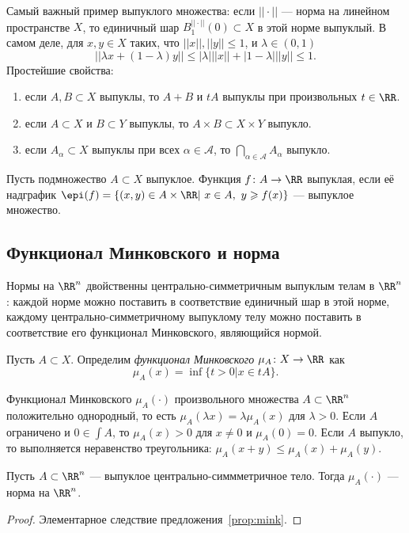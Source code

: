 Самый важный пример выпуклого множества: если $||\cdot||$ --- норма на линейном пространстве $X$, то единичный шар $B^{||\cdot||}_1(0)\subset X$ в этой норме выпуклый. В самом деле, для $x,y\in X$ таких, что $||x||,||y||\leqslant 1$, и $\lambda\in(0,1)$
		\begin{equation*}
			||\lambda x+(1-\lambda)y||\leqslant |\lambda|||x||+|1-\lambda|||y||\leqslant 1.
		\end{equation*}
Простейшие свойства:
\begin{enumerate}
	\item если $A,B\subset X$ выпуклы, то $A+B$ и $tA$ выпуклы при произвольных $t\in\RR$.
	\item если $A\subset X$ и $B\subset Y$ выпуклы, то $A\times B\subset X\times Y$ выпукло.
	\item если $A_{\alpha}\subset X$ выпуклы при всех $\alpha\in\mathcal{A}$, то $\bigcap_{\alpha\in\mathcal{A}} A_{\alpha}$ выпукло.
\end{enumerate}
\begin{defin}
	Пусть подмножество $A\subset X$ выпуклое. Функция $f\colon A\to\RR$ выпуклая, если её надграфик $\epi(f)=\{(x,y)\in A\times\RR| \ x\in A,\ y\geqslant f(x)\}$ --- выпуклое множество.
\end{defin}

\subsection{Функционал Минковского и норма}
Нормы на $\RR^n$ двойственны центрально-симметричным выпуклым телам в $\RR^n$: каждой норме можно поставить в соответствие единичный шар в этой норме, каждому центрально-симметричному выпуклому телу можно поставить в соответствие его функционал Минковского, являющийся нормой.
\begin{defin}
	Пусть $A\subset X$. Определим \textit{функционал Минковского} $\mu_A\colon X\to\RR$ как
		\begin{equation}
			\mu_A(x)=\inf\{t>0|x\in tA\}.
		\end{equation}
\end{defin}
\begin{prop}\label{prop:mink}
	Функционал Минковского $\mu_A(\cdot)$ произвольного множества $A\subset\RR^n$ положительно однородный, то есть $\mu_A(\lambda x)=\lambda\mu_A(x)$ для $\lambda>0$. Если $A$ ограничено и $0\in\int A$, то $\mu_A(x)>0$ для $x\neq 0$ и $\mu_A(0)=0$. Если $A$ выпукло, то выполняется неравенство треугольника: $\mu_A(x+y)\leqslant\mu_A(x)+\mu_A(y)$.
\end{prop}
\begin{prop}
	Пусть $A\subset\RR^n$ --- выпуклое центрально-симмметричное тело. Тогда $\mu_A(\cdot)$ --- норма на $\RR^n$.
\end{prop}
\begin{proof}
	Элементарное следствие предложения~\ref{prop:mink}.
\end{proof}

